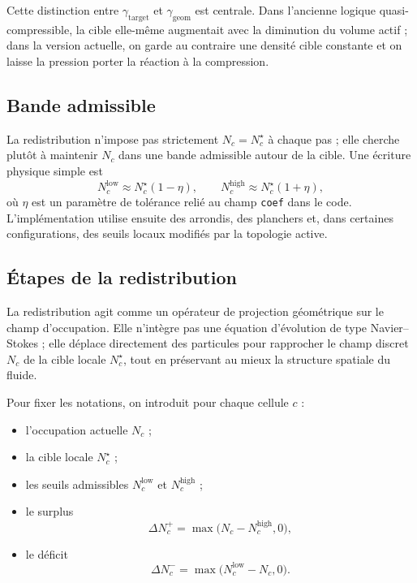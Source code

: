 \documentclass[11pt,a4paper]{article}
\begin{document}
Cette distinction entre \(\gamma_{\mathrm{target}}\) et \(\gamma_{\mathrm{geom}}\) est centrale. Dans l'ancienne logique quasi-compressible, la cible elle-même augmentait avec la diminution du volume actif ; dans la version actuelle, on garde au contraire une densité cible constante et on laisse la pression porter la réaction à la compression.

\subsection{Bande admissible}

La redistribution n'impose pas strictement $N_c=N_c^{\star}$ à chaque pas ; elle cherche plutôt à maintenir $N_c$ dans une bande admissible autour de la cible. Une écriture physique simple est
\begin{equation}
 N_c^{\mathrm{low}} \approx N_c^{\star}(1-\eta),
\qquad
 N_c^{\mathrm{high}} \approx N_c^{\star}(1+\eta),
\end{equation}
où $\eta$ est un paramètre de tolérance relié au champ \verb|coef| dans le code. L'implémentation utilise ensuite des arrondis, des planchers et, dans certaines configurations, des seuils locaux modifiés par la topologie active.

\subsection{Étapes de la redistribution}

La redistribution agit comme un opérateur de projection géométrique sur le champ d'occupation. Elle n'intègre pas une équation d'évolution de type Navier--Stokes ; elle déplace directement des particules pour rapprocher le champ discret $N_c$ de la cible locale $N_c^{\star}$, tout en préservant au mieux la structure spatiale du fluide.

Pour fixer les notations, on introduit pour chaque cellule $c$ :
\begin{itemize}
  \item l'occupation actuelle $N_c$ ;
  \item la cible locale $N_c^{\star}$ ;
  \item les seuils admissibles $N_c^{\mathrm{low}}$ et $N_c^{\mathrm{high}}$ ;
  \item le surplus
  \begin{equation}
    \Delta N_c^{+} = \max\bigl(N_c - N_c^{\mathrm{high}}, 0\bigr),
  \end{equation}
  \item le déficit
  \begin{equation}
    \Delta N_c^{-} = \max\bigl(N_c^{\mathrm{low}} - N_c, 0\bigr).
  \end{equation}
\end{itemize}
\end{document}
